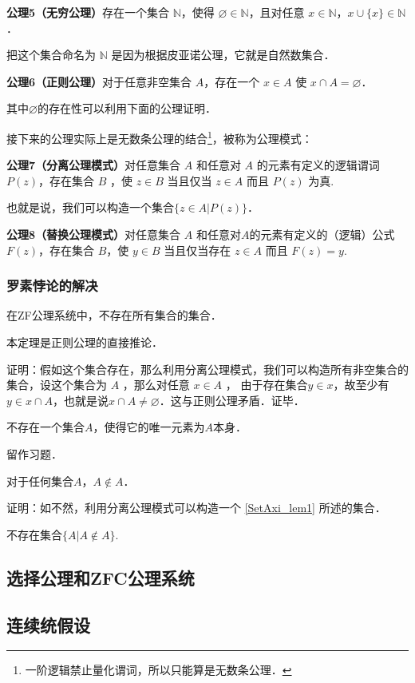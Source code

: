 \textbf{公理5（无穷公理）}存在一个集合 $\mathbb{N}$，使得 $\varnothing\in\mathbb{N}$，且对任意 $x\in \mathbb{N}$，$x\cup\{x\}\in\mathbb{N}$．

把这个集合命名为 $\mathbb{N}$ 是因为根据皮亚诺公理，它就是自然数集合．

\textbf{公理6（正则公理）}对于任意非空集合 $A$，存在一个 $x\in A$ 使 $x\cap A=\varnothing$．

其中$\varnothing$的存在性可以利用下面的公理证明．

接下来的公理实际上是无数条公理的结合\footnote{一阶逻辑禁止量化谓词，所以只能算是无数条公理．}，被称为公理模式：

\textbf{公理7（分离公理模式）}对任意集合 $A$ 和任意对 $A$ 的元素有定义的逻辑谓词 $P(z)$，存在集合 $B$ ，使 $z\in B$ 当且仅当 $z\in A$ 而且 $P(z)$ 为真.

也就是说，我们可以构造一个集合$\{z\in A | P(z)\}$．

\textbf{公理8（替换公理模式）}对任意集合 $A$ 和任意对$A$的元素有定义的（逻辑）公式$F(z)$，存在集合 $B$，使 $y\in B$ 当且仅当存在 $z\in A$ 而且 $F(z)=y$.

\subsubsection{罗素悖论的解决}
\begin{theorem}{}
在ZF公理系统中，不存在所有集合的集合．
\end{theorem}

本定理是正则公理的直接推论．

证明：假如这个集合存在，那么利用分离公理模式，我们可以构造所有非空集合的集合，设这个集合为 $A$ ，那么对任意 $x\in A$ ， 由于存在集合$y\in x$，故至少有$y\in x\cap A$，也就是说$x\cap A\neq\varnothing$．这与正则公理矛盾．证毕．

\begin{lemma}{}\label{SetAxi_lem1}
不存在一个集合$A$，使得它的唯一元素为$A$本身．
\end{lemma}

留作习题．

\begin{theorem}{}
对于任何集合$A$，$A\notin A$．
\end{theorem}

证明：如不然，利用分离公理模式可以构造一个 \autoref{SetAxi_lem1} 所述的集合．

\begin{theorem}{}
不存在集合$\{A|A\notin A\}$.
\end{theorem}



\subsection{选择公理和ZFC公理系统}

\subsection{连续统假设}



